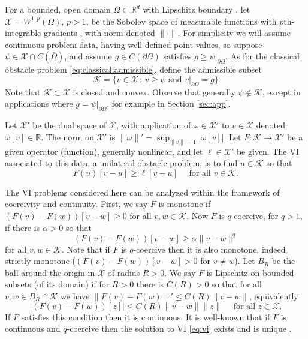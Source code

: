 \documentclass[]{interact}
\theoremstyle{plain}%
\theoremstyle{definition}
\theoremstyle{remark}
\newcommand{\RR}{\mathbb{R}}
\newcommand{\cK}{\mathcal{K}}
\newcommand{\cX}{\mathcal{X}}
\begin{document}
For a bounded, open domain $\Omega \subset \RR^d$ with Lipschitz boundary \cite{Ciarlet2002}, let $\cX = W^{1,p}(\Omega)$, $p>1$, be the Sobolev space of measurable functions with $p$th-integrable gradients \cite{Evans2010}, with norm denoted $\|\cdot\|$.  For simplicity we will assume continuous problem data, having well-defined point values, so suppose $\psi \in \cX \cap C(\bar\Omega)$, and assume $g\in C(\partial \Omega)$ satisfies $g \ge \psi|_{\partial\Omega}$.  As for the classical obstacle problem \eqref{eq:classical:admissible}, define the admissible subset
\begin{equation} \label{eq:admissible}
\cK = \{v \in \cX \,:\, v \ge \psi \text{ and } v|_{\partial \Omega} = g\}
\end{equation}
Note that $\cK\subset \cX$ is closed and convex.  Observe that generally $\psi\notin\cK$, except in applications where $g = \psi|_{\partial\Omega}$, for example in Section \ref{sec:app}.

Let $\cX'$ be the dual space of $\cX$, with application of $\omega \in \cX'$ to $v\in \cX$ denoted $\omega[v] \in \RR$.  The norm on $\cX'$ is $\|\omega\|' = \sup_{\|v\|=1} |\omega[v]|$.  Let $F:\cK \to \cX'$ be a given operator (function), generally nonlinear, and let $\ell\in \cX'$ be given.  The VI associated to this data, a unilateral obstacle problem, is to find $u\in \cK$ so that
\begin{equation} \label{eq:vi}
F(u)[v - u] \ge \ell[v - u] \quad \text{ for all } v \in \cK.
\end{equation}

The VI problems considered here can be analyzed within the framework of coercivity and continuity.  First, we say $F$ is monotone if $(F(v) - F(w))[v - w] \ge 0$ for all $v,w \in \cK$.  Now $F$ is $q$-coercive, for $q>1$, if there is $\alpha>0$ so that
\begin{equation} \label{eq:coercive}
(F(v) - F(w))[v - w] \ge \alpha \|v-w\|^q
\end{equation}
for all $v,w \in \cK$.  Note that if $F$ is $q$-coercive then it is also monotone, indeed strictly monotone ($(F(v) - F(w))[v - w] > 0$ for $v\ne w$).  Let $B_R$ be the ball around the origin in $\cX$ of radius $R>0$.  We say $F$ is Lipschitz on bounded subsets (of its domain) if for $R>0$ there is $C(R)>0$ so that for all $v,w \in B_R\cap \cK$ we have $\|F(v)-F(w)\|' \le C(R) \|v-w\|$, equivalently
\begin{equation} \label{eq:lipschitz}
\left|(F(v)-F(w))[z]\right| \le C(R) \|v-w\| \|z\| \quad \text{ for all } z \in \cX.
\end{equation}
If $F$ satisfies this condition then it is continuous.  It is well-known that if $F$ is continuous and $q$-coercive then the solution to VI \eqref{eq:vi} exists and is unique \cite[Corollary III.1.8]{KinderlehrerStampacchia1980}.
\end{document}
